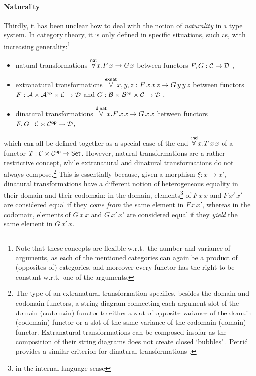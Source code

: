 \documentclass{lmcs} %
\theoremstyle{plain}\newtheorem{satz}[thm]{Satz} %
\theoremstyle{plain}
\theoremstyle{definition}
\begin{document}
\paragraph{Naturality}
Thirdly, it has been unclear how to deal with the notion of \emph{naturality} in a type system.
In category theory, it is only defined in specific situations, such as, with increasing generality:\footnote{Note that these concepts are flexible w.r.t.\ the number and variance of arguments, as each of the mentioned categories can again be a product of (opposites of) categories, and moreover every functor has the right to be constant w.r.t.\ one of the arguments.}
\begin{itemize}
	\item natural transformations $\overset{\mathsf{nat}}{\forall} x . F\,x \to G\,x$ between functors $F, G : {\mathcal{C}} \to {\mathcal{D}}$ \cite{nat-equiv},
	\item extranatural transformations $\overset{\mathsf{exnat}}{\forall} x, y, z : F\,x\,x\,z \to G\,y\,y\,z$ between functors $F : \mathcal{A} \times \mathcal{A}^{\mathsf{op}} \times {\mathcal{C}} \to {\mathcal{D}}$ and $G : \mathcal{B} \times \mathcal{B}^{\mathsf{op}} \times {\mathcal{C}} \to {\mathcal{D}}$ \cite{kelly-tensor-extranat},
	\item dinatural transformations $\overset{\mathsf{dinat}}{\forall} x.F\,x\,x \to G\,x\,x$ between functors $F, G : {\mathcal{C}} \times {\mathcal{C}}^{\mathsf{op}} \to {\mathcal{D}}$,
\end{itemize}
which can all be defined together as a special case of the end $\overset{\mathsf{end}}{\forall} x.T\,x\,x$ of a functor $T : {\mathcal{C}} \times {\mathcal{C}}^{\mathsf{op}} \to {\mathsf{Set}}$.
However, natural transformations are a rather restrictive concept, while extranatural and dinatural transformations do not always compose.\footnote{The type of an extranatural transformation specifies, besides the domain and codomain functors, a string diagram connecting each argument slot of the domain (codomain) functor to either a slot of opposite variance of the domain (codomain) functor or a slot of the same variance of the codomain (domain) functor. Extranatural transformations can be composed insofar as the composition of their string diagrams does not create closed `bubbles' \cite{extranat-compose}. Petri\'{c} provides a similar criterion for dinatural transformations \cite{g-dinat}.}
This is essentially because, given a morphism $\xi : x \to x'$, dinatural transformations have a different notion of heterogeneous equality in their domain and their codomain: in the domain, elements\footnote{in the internal language sense} of $F\,x\,x$ and $F\,x'\,x'$ are considered equal if they \emph{come from} the same element in $F\,x\,x'$, whereas in the codomain, elements of $G\,x\,x$ and $G\,x'\,x'$ are considered equal if they \emph{yield} the same element in $G\,x'\,x$.
\end{document}

